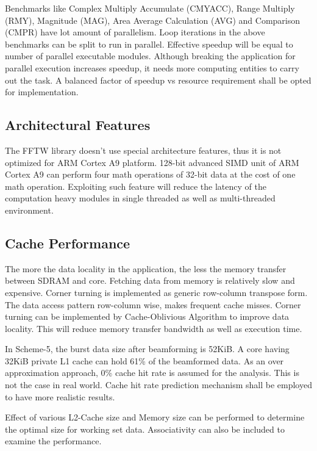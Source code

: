 Benchmarks like Complex Multiply Accumulate (CMYACC), Range Multiply (RMY), Magnitude (MAG), Area Average Calculation (AVG) and Comparison (CMPR) have lot amount of parallelism. Loop iterations in the above benchmarks can be split to run in parallel. Effective speedup will be equal to number of parallel executable modules. Although breaking the application for parallel execution increases speedup, it needs more computing entities to carry out the task. A balanced factor of speedup vs resource requirement shall be opted for implementation. 

\subsection{Architectural Features}
The FFTW library doesn't use special architecture features, thus it is not optimized for ARM Cortex A9 platform. 128-bit advanced SIMD unit of ARM Cortex A9 can perform four math operations of 32-bit data at the cost of one math operation. Exploiting such feature will reduce the latency of the computation heavy modules in single threaded as well as multi-threaded environment.

\subsection{Cache Performance}
The more the data locality in the application, the less the memory transfer between SDRAM and core. Fetching data from memory is relatively slow and expensive. Corner turning is implemented as generic row-column transpose form. The data access pattern row-column wise, makes frequent cache misses. Corner turning can be implemented by Cache-Oblivious Algorithm to improve data locality. This will reduce memory transfer bandwidth as well as execution time.  \vspace*{0.2cm}

In Scheme-5, the burst data size after beamforming is 52KiB. A core having 32KiB private L1 cache can hold 61\% of the beamformed data. As an over approximation approach, 0\% cache hit rate is assumed for the analysis. This is not the case in real world. Cache hit rate prediction mechanism shall be employed to have more realistic results. \vspace*{0.2cm}

Effect of various L2-Cache size and Memory size can be performed to determine the optimal size for working set data. Associativity can also be included to examine the performance.

